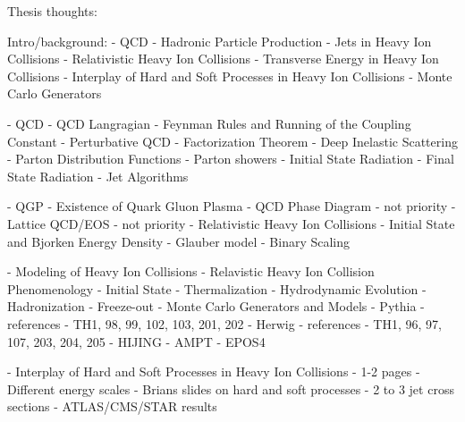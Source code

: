 Thesis thoughts:

Intro/background: 
- QCD
- Hadronic Particle Production
	- Jets in Heavy Ion Collisions
- Relativistic Heavy Ion Collisions
	- Transverse Energy in Heavy Ion Collisions
	- Interplay of Hard and Soft Processes in Heavy Ion Collisions
- Monte Carlo Generators

- QCD
	- QCD Langragian 
	- Feynman Rules and Running of the Coupling Constant
	- Perturbative QCD
	    - Factorization Theorem
	    - Deep Inelastic Scattering
	    - Parton Distribution Functions
	- Parton showers
	    - Initial State Radiation
	    - Final State Radiation
	    - Jet Algorithms

- QGP
	- Existence of Quark Gluon Plasma
	- QCD Phase Diagram - not priority 
	- Lattice QCD/EOS - not priority
	- Relativistic Heavy Ion Collisions
	    - Initial State and Bjorken Energy Density
	    - Glauber model
	    - Binary Scaling

- Modeling of Heavy Ion Collisions
	- Relavistic Heavy Ion Collision Phenomenology
	    - Initial State
	    - Thermalization
	    - Hydrodynamic Evolution
	    - Hadronization
	    - Freeze-out
	- Monte Carlo Generators and Models
		- Pythia
			- references - TH1, 98, 99, 102, 103, 201, 202
		- Herwig
			- references - TH1, 96, 97, 107, 203, 204, 205
		- HIJING
		- AMPT
		- EPOS4

- Interplay of Hard and Soft Processes in Heavy Ion Collisions - 1-2 pages
	- Different energy scales 
	- Brians slides on hard and soft processes
	- 2 to 3 jet cross sections 
	- ATLAS/CMS/STAR results 


